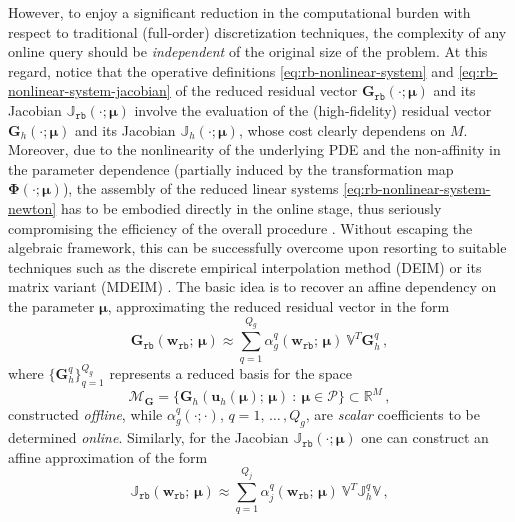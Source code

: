 \documentclass[12pt, a4paper, twoside, openright, notitlepage]{report}
\numberwithin{equation}{chapter}
\theoremstyle{theorem}
\theoremstyle{definition}
\theoremstyle{remark}
\theoremstyle{proposition}
\numberwithin{figure}{chapter}
\newcommand{\bg}[1]{\boldsymbol{#1}}
\begin{document}
		However, to enjoy a significant reduction in the computational burden with respect to traditional (full-order) discretization techniques, the complexity of any online query should be \emph{independent} of the original size of the problem. At this regard, notice that the operative definitions \eqref{eq:rb-nonlinear-system} and \eqref{eq:rb-nonlinear-system-jacobian} of the reduced residual vector $\mathbf{G}_{\texttt{rb}}(\cdot; \bg{\mu})$ and its Jacobian $\mathbb{J}_{\texttt{rb}}(\cdot; \bg{\mu})$ involve the evaluation of the (high-fidelity) residual vector $\mathbf{G}_h(\cdot; \bg{\mu})$ and its Jacobian $\mathbb{J}_h(\cdot; \bg{\mu})$, whose cost clearly dependens on $M$. Moreover, due to the nonlinearity of the underlying PDE and the non-affinity in the parameter dependence (partially induced by the transformation map $\bg{\Phi}(\cdot; \bg{\mu})$), the assembly of the reduced linear systems \eqref{eq:rb-nonlinear-system-newton} has to be embodied directly in the online stage, thus seriously compromising the efficiency of the overall procedure \cite{Bar04}. Without escaping the algebraic framework, this can be successfully overcome upon resorting to suitable techniques such as the discrete empirical interpolation method (DEIM) \cite{Cha10} or its matrix variant (MDEIM) \cite{NMA15}. The basic idea is to recover an affine dependency on the parameter $\bg{\mu}$, approximating the reduced residual vector in the form
		\begin{equation*}
			\mathbf{G}_{\texttt{rb}}(\mathbf{w}_{\texttt{rb}}; \, \bg{\mu}) \approx \sum_{q = 1}^{Q_g} \alpha_g^q(\mathbf{w}_{\texttt{rb}}; \, \bg{\mu}) ~ \mathbb{V}^T \mathbf{G}_h^q \, , 
		\end{equation*}
		where $\big\lbrace \mathbf{G}_h^q \big\rbrace_{q = 1}^{Q_g}$ represents a reduced basis for the space
		\begin{equation*}
			\mathcal{M}_{\mathbf{G}} = \big\lbrace \mathbf{G}_h(\mathbf{u}_h(\bg{\mu}); \, \bg{\mu}) ~ : ~ \bg{\mu} \in \mathcal{P} \big\rbrace \subset \mathbb{R}^M \, ,
		\end{equation*}
		constructed \emph{offline}, while $\alpha_g^q(\cdot; \cdot)$, $q = 1, \, \ldots \, , Q_g$, are \emph{scalar} coefficients to be determined \emph{online}. Similarly, for the Jacobian $\mathbb{J}_{\texttt{rb}}(\cdot; \bg{\mu})$ one can construct an affine approximation of the form
		\begin{equation*}
			\mathbb{J}_{\texttt{rb}}(\mathbf{w}_{\texttt{rb}}; \, \bg{\mu}) \approx \sum_{q = 1}^{Q_j} \alpha_j^q(\mathbf{w}_{\texttt{rb}}; \, \bg{\mu}) ~ \mathbb{V}^T \mathbb{J}_h^q \mathbb{V} \, ,
		\end{equation*}
\end{document}
